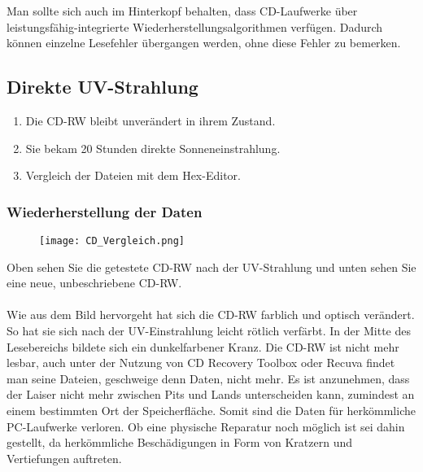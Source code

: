 \documentclass[10pt,a4paper]{article} %
\begin{document}
Man sollte sich auch im Hinterkopf behalten, dass CD-Laufwerke über leistungsfähig-integrierte Wiederherstellungsalgorithmen verfügen. Dadurch können einzelne Lesefehler übergangen werden, ohne diese Fehler zu bemerken.\\


\subsection{Direkte UV-Strahlung}

\begin{enumerate}
\item Die CD-RW bleibt unverändert in ihrem Zustand.
\item  Sie bekam 20 Stunden direkte Sonneneinstrahlung.
\item Vergleich der Dateien mit dem Hex-Editor. 
\end{enumerate}

\newpage
\subsubsection{Wiederherstellung der Daten}

\begin{figure}[ht]
\label{Bild}
	\centering
	 \texttt{[image: CD\_Vergleich.png]}
\end{figure}

Oben sehen Sie die getestete CD-RW nach der UV-Strahlung und unten sehen Sie eine neue, unbeschriebene CD-RW.\\\\

Wie aus dem Bild hervorgeht hat sich die CD-RW farblich und optisch verändert. So hat sie sich nach der UV-Einstrahlung leicht rötlich verfärbt. In der Mitte des Lesebereichs bildete sich ein dunkelfarbener Kranz. Die CD-RW ist nicht mehr lesbar, auch unter der Nutzung von CD Recovery Toolbox oder Recuva findet man seine Dateien, geschweige denn Daten, nicht mehr. Es ist anzunehmen, dass der Laiser nicht mehr zwischen Pits und Lands unterscheiden kann, zumindest an einem bestimmten Ort der Speicherfläche. Somit sind die Daten für herkömmliche PC-Laufwerke verloren. Ob eine physische Reparatur noch möglich ist sei dahin gestellt, da herkömmliche Beschädigungen in Form von Kratzern und Vertiefungen auftreten.
\end{document}
